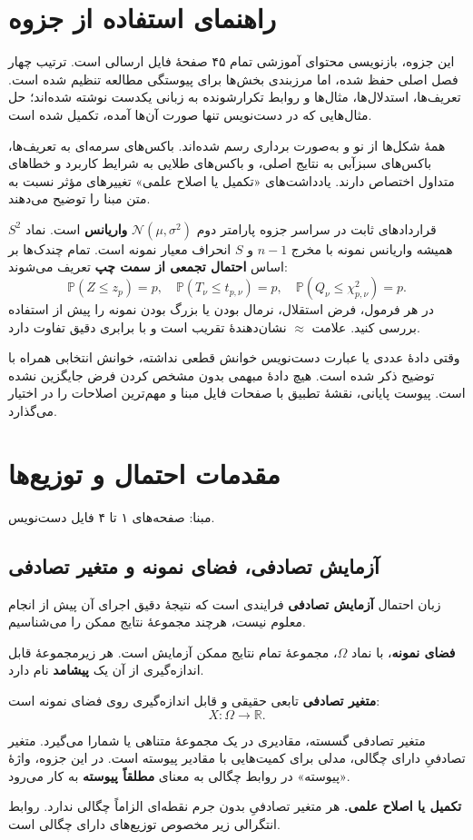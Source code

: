 \documentclass[12pt,a4paper,oneside]{report}
\newcounter{ex}[chapter]
\newcommand{\edit}[1]{\par\begingroup\small\color{alert}\textbf{تکمیل یا اصلاح علمی.} #1\par\endgroup}
\newcommand{\source}[1]{\par{\small\color{muted} مبنا: صفحه‌های #1 فایل دست‌نویس.}\par}
\newcommand{\N}{\mathcal N}
\newcommand{\R}{\mathbb R}
\newcommand{\Prob}{\mathbb P}
\begin{document}
\chapter*{راهنمای استفاده از جزوه}
این جزوه، بازنویسی محتوای آموزشی تمام ۴۵ صفحهٔ فایل ارسالی است. ترتیب چهار فصل اصلی حفظ شده، اما مرزبندی بخش‌ها برای پیوستگی مطالعه تنظیم شده است. تعریف‌ها، استدلال‌ها، مثال‌ها و روابط تکرارشونده به زبانی یکدست نوشته شده‌اند؛ حل مثال‌هایی که در دست‌نویس تنها صورت آن‌ها آمده، تکمیل شده است.

همهٔ شکل‌ها از نو و به‌صورت برداری رسم شده‌اند. باکس‌های سرمه‌ای به تعریف‌ها، باکس‌های سبزآبی به نتایج اصلی، و باکس‌های طلایی به شرایط کاربرد و خطاهای متداول اختصاص دارند. یادداشت‌های «تکمیل یا اصلاح علمی» تغییرهای مؤثر نسبت به متن مبنا را توضیح می‌دهند.
\begin{important}{قراردادهای ثابت در سراسر جزوه}
پارامتر دوم $\N(\mu,\sigma^2)$ \textbf{واریانس} است. نماد $S^2$ همیشه واریانس نمونه با مخرج $n-1$ و $S$ انحراف معیار نمونه است. تمام چندک‌ها بر اساس \textbf{احتمال تجمعی از سمت چپ} تعریف می‌شوند:
\[
\Prob(Z\le z_p)=p,\quad
\Prob(T_\nu\le t_{p,\nu})=p,\quad
\Prob(Q_\nu\le\chi^2_{p,\nu})=p.
\]
در هر فرمول، فرض استقلال، نرمال بودن یا بزرگ بودن نمونه را پیش از استفاده بررسی کنید. علامت $\approx$ نشان‌دهندهٔ تقریب است و با برابری دقیق تفاوت دارد.
\end{important}
وقتی دادهٔ عددی یا عبارت دست‌نویس خوانش قطعی نداشته، خوانش انتخابی همراه با توضیح ذکر شده است. هیچ دادهٔ مبهمی بدون مشخص کردن فرض جایگزین نشده است. پیوست پایانی، نقشهٔ تطبیق با صفحات فایل مبنا و مهم‌ترین اصلاحات را در اختیار می‌گذارد.
\tableofcontents
\clearpage{}
\chapter{مقدمات احتمال و توزیع‌ها}
\source{۱ تا ۴}
\section{آزمایش تصادفی، فضای نمونه و متغیر تصادفی}
\begin{definition}{زبان احتمال}
\textbf{آزمایش تصادفی} فرایندی است که نتیجهٔ دقیق اجرای آن پیش از انجام معلوم نیست، هرچند مجموعهٔ نتایج ممکن را می‌شناسیم.

\textbf{فضای نمونه}، با نماد $\Omega$، مجموعهٔ تمام نتایج ممکن آزمایش است. هر زیرمجموعهٔ قابل اندازه‌گیری از آن یک \textbf{پیشامد} نام دارد.

\textbf{متغیر تصادفی} تابعی حقیقی و قابل اندازه‌گیری روی فضای نمونه است:
\[X:\Omega\longrightarrow\R.\]
\end{definition}
متغیر تصادفی گسسته، مقادیری در یک مجموعهٔ متناهی یا شمارا می‌گیرد. متغیر تصادفیِ دارای چگالی، مدلی برای کمیت‌هایی با مقادیر پیوسته است. در این جزوه، واژهٔ «پیوسته» در روابط چگالی به معنای \textbf{مطلقاً پیوسته} به کار می‌رود.
\edit{هر متغیر تصادفیِ بدون جرم نقطه‌ای الزاماً چگالی ندارد. روابط انتگرالی زیر مخصوص توزیع‌های دارای چگالی است.}
\end{document}
